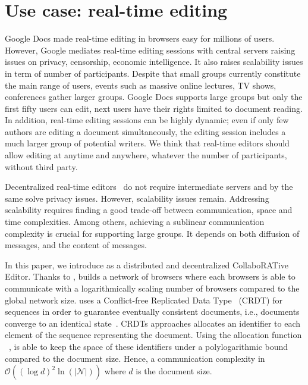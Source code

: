 
\section{Use case: real-time editing}


Google Docs made real-time editing in browsers easy for millions of
users. However, Google mediates real-time editing sessions with central servers
raising issues on privacy, censorship, economic intelligence. It also raises
scalability issues in term of number of participants.  Despite that small groups
currently constitute the main range of users, events such as massive online
lectures, TV shows, conferences gather larger groups.  Google Docs supports
large groups but only the first fifty users can edit, next users have their
rights limited to document reading. In addition, real-time editing sessions can
be highly dynamic; even if only few authors are editing a document
simultaneously, the editing session includes a much larger group of potential
writers. We think that real-time editors should allow editing at anytime and
anywhere, whatever the number of participants, without third party.

Decentralized real-time editors~\cite{oster2006data, sun1998operational,
  sun2009contextbased} do not require intermediate servers and by the same solve
privacy issues. However, scalability issues remain.  Addressing scalability
requires finding a good trade-off between communication, space and time
complexities. Among others, achieving a sublinear communication complexity is
crucial for supporting large groups.  It depends on both diffusion of messages,
and the content of messages.

In this paper,  we introduce \CRATE as a distributed
and decentralized CollaboRATive Editor. Thanks to \SPRAY, \CRATE builds a
network of browsers where each browsers is able to communicate with a
logarithmically scaling number of browsers compared to the global network size.
\CRATE uses a Conflict-free Replicated Data Type~\cite{shapiro2011conflict,
  shapiro2011comprehensive} (CRDT) for sequences in order to guarantee
eventually consistent documents, i.e., documents converge to an identical
state~\cite{bailis2013eventual}. CRDTs approaches allocates an identifier to
each element of the sequence representing the document. Using the allocation
function \LSEQ~\cite{nedelec2013lseq}, \CRATE is able to keep the space of these
identifiers under a polylogarithmic bound compared to the document size. Hence,
a communication complexity in $\mathcal{O}((\log d)^2\ln(|\mathcal{N}|))$ where
$d$ is the document size.

